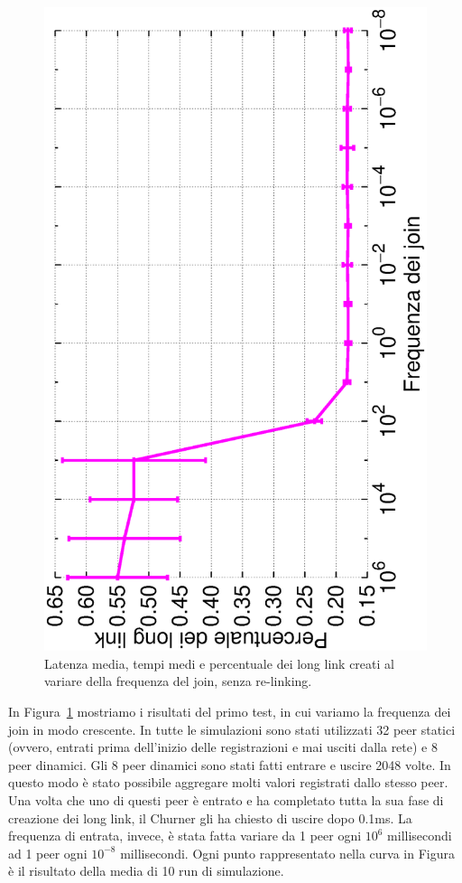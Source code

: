 \documentclass[prodmode,acmtap]{acmlarge}
\begin{document}
\begin{figure}
	\includegraphics[scale=.22, angle=-90]{imgs/norelink-freq-percLongLinks.eps}
\endminipage\hfill
\caption{Latenza media, tempi medi e percentuale dei long link creati al variare della frequenza del join, senza re-linking.}
\label{img:stabilita}
\end{figure}

In Figura~\ref{img:stabilita} mostriamo i risultati del primo test, in cui variamo la frequenza dei join in modo crescente.
In tutte le simulazioni sono stati utilizzati 32 peer statici (ovvero, entrati prima dell'inizio delle registrazioni e mai usciti dalla rete) e 8 peer dinamici. Gli 8 peer dinamici sono stati fatti entrare e uscire 2048 volte. In questo modo è stato possibile aggregare molti valori registrati dallo stesso peer. Una volta che uno di questi peer è entrato e ha completato tutta la sua fase di creazione dei long link, il Churner gli ha chiesto di uscire dopo 0.1ms. La frequenza di entrata, invece, è stata fatta variare da 1 peer ogni $10^6$ millisecondi ad 1 peer ogni $10^{-8}$ millisecondi. Ogni punto rappresentato nella curva in Figura è il risultato della media di 10 run di simulazione.
\end{document}
